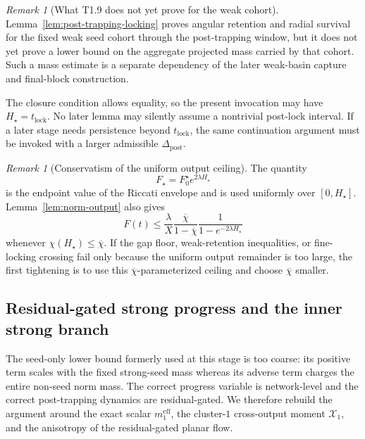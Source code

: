 \documentclass{article} %
\theoremstyle{plain}
\theoremstyle{definition}
\theoremstyle{remark}
\newtheorem{remark}[theorem]{Remark}
\begin{document}
\begin{remark}[What T1.9 does not yet prove for the weak cohort]
\label{rem:T19-weak-status}
Lemma~\ref{lem:post-trapping-locking} proves angular retention and radial
survival for the fixed weak seed cohort through the post-trapping window, but
it does not yet prove a lower bound on the aggregate projected mass carried
by that cohort.  Such a mass estimate is a separate dependency of the later
weak-basin capture and final-block construction.

The closure condition allows equality, so the present invocation may have
$H_\star=t_{\mathrm{lock}}$.  No later lemma may silently assume a nontrivial
post-lock interval.  If a later stage needs persistence beyond
$t_{\mathrm{lock}}$, the same continuation argument must be invoked with a
larger admissible $\Delta_{\mathrm{post}}$.
\end{remark}

\begin{remark}[Conservatism of the uniform output ceiling]
\label{rem:T19-Fstar-conservative}
The quantity
\[
F_\star=F_0^\star e^{2\lambda H_\star}
\]
is the endpoint value of the Riccati envelope and is used uniformly over
$[0,H_\star]$.  Lemma~\ref{lem:norm-output} also gives
\[
F(t)
\le
\frac{\lambda}{X}
\frac{\overline\chi}{1-\overline\chi}
\frac1{1-e^{-2\lambda H_\star}}
\]
whenever $\chi(H_\star)\le\overline\chi$.  If the gap floor, weak-retention
inequalities, or fine-locking crossing fail only because the uniform output
remainder is too large, the first tightening is to use this
$\overline\chi$-parameterized ceiling and choose $\overline\chi$ smaller.
\end{remark}


\subsection{Residual-gated strong progress and the inner strong branch}
\label{subsec:T110-progress}

The seed-only lower bound formerly used at this stage is too coarse: its
positive term scales with the fixed strong-seed mass whereas its adverse
term charges the entire non-seed norm mass.  The correct progress variable is
network-level and the correct post-trapping dynamics are residual-gated.  We
therefore rebuild the argument around the exact scalar
$m_1^{\mathrm{eff}}$, the cluster-$1$ cross-output moment $\mathcal X_1$,
and the anisotropy of the residual-gated planar flow.
\end{document}
